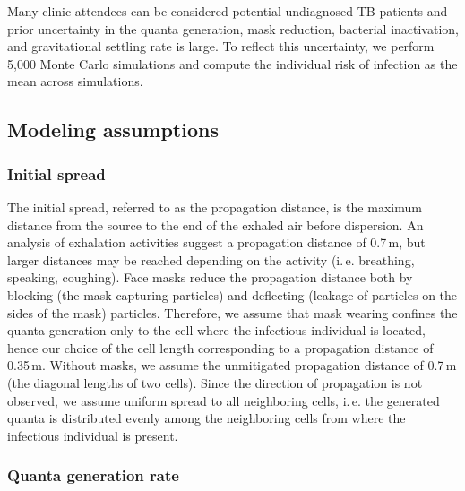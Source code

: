 \documentclass[fleqn,11pt]{wlscirep_supp}
\newcommand\ie{i.\,e.\xspace}
\begin{document}
Many clinic attendees can be considered potential undiagnosed TB patients and prior uncertainty in the quanta generation, mask reduction, bacterial inactivation, and gravitational settling rate is large. To reflect this uncertainty, we perform 5,000 Monte Carlo simulations and compute the individual risk of infection as the mean across simulations.  

\subsection{Modeling assumptions}\label{sec:priors}

\subsubsection{Initial spread}

The initial spread, referred to as the propagation distance, is the maximum distance from the source to the end of the exhaled air before dispersion. An analysis of exhalation activities suggest a propagation distance of 0.7\,m\cite{Tang2013PLoSOne}, but larger distances may be reached depending on the activity (\ie breathing, speaking, coughing). Face masks reduce the propagation distance both by blocking (the mask capturing particles) and deflecting (leakage of particles on the sides of the mask) particles\cite{Tang2009RoyalInt,Hui2012PLoSOne,Mansour2013AerosolMed}. Therefore, we assume that mask wearing confines the quanta generation only to the cell where the infectious individual is located, hence our choice of the cell length corresponding to a propagation distance of 0.35\,m. Without masks, we assume the unmitigated propagation distance of 0.7\,m (the diagonal lengths of two cells). Since the direction of propagation is not observed, we assume uniform spread to all neighboring cells, \ie the generated quanta is distributed evenly among the neighboring cells from where the infectious individual is present.


\subsubsection{Quanta generation rate}
\end{document}

